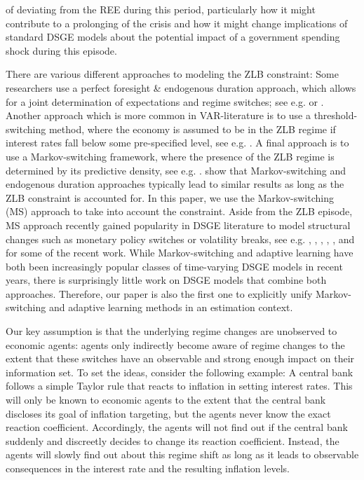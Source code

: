 \documentclass[12pt,reqno]{article}
\numberwithin{equation}{section}
\begin{document}
of deviating from the REE during this period, particularly how it might contribute to a prolonging of the crisis and how it might change implications of standard DSGE models about the potential impact of a government spending shock during this episode. 

There are various different approaches to modeling the ZLB constraint: Some researchers use a perfect foresight \&  endogenous duration approach, which allows for a joint determination of expectations and regime switches; see e.g. \cite{maih2015efficient} or \cite{linde2017estimation}. Another approach which is more common in VAR-literature is to use a threshold-switching method, where the economy is assumed to be in the ZLB regime if interest rates fall below some pre-specified level, see e.g. \cite{bonam2017effects}. A final approach is to use a Markov-switching framework, where the presence of the ZLB regime is determined by its predictive density, see e.g. \cite{binning2016implementing}. \cite{linde2017estimation} show that Markov-switching and endogenous duration approaches typically lead to similar results as long as the ZLB constraint is accounted for. In this paper, we use the Markov-switching (MS) approach to take into account the constraint. Aside from the ZLB episode, MS approach recently gained popularity in DSGE literature to model structural changes such as monetary policy switches or volatility breaks, see e.g. \cite{sims2006were}, \cite{davig2007generalizing}, \cite{sims2008methods}, \cite{liu2011sources}, \cite{liu2011evolving}, \cite{bianchi2016methods} and \cite{bianchi2017monetary} for some of the recent work. While Markov-switching and adaptive learning have both been increasingly popular classes of time-varying DSGE models in recent years, there is surprisingly little work on DSGE models that combine both approaches. Therefore, our paper is also the first one to explicitly unify Markov-switching and adaptive learning methods in an estimation context. 

Our key assumption is that  the underlying regime changes are unobserved to economic agents: agents only indirectly become aware of regime changes to the extent that these switches have an observable and strong enough impact on their information set. To set the ideas, consider the following example: A central bank follows a simple Taylor rule that reacts to inflation in setting interest rates. This will only be known to economic agents to the extent that the central bank discloses its goal of inflation targeting, but the agents never know the exact reaction coefficient. Accordingly, the agents will not find out if the central bank suddenly and discreetly decides to change its reaction coefficient. Instead, the agents will slowly find out about this regime shift as long as it  leads to observable consequences in the interest rate and the resulting inflation levels. 
\end{document}
